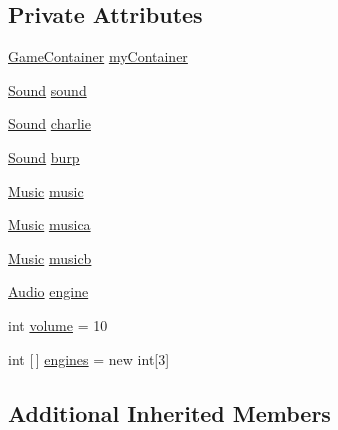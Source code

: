 \subsection*{Private Attributes}
\begin{DoxyCompactItemize}
\item 
\mbox{\hyperlink{classorg_1_1newdawn_1_1slick_1_1_game_container}{Game\+Container}} \mbox{\hyperlink{classorg_1_1newdawn_1_1slick_1_1tests_1_1_sound_test_a468a454f66fe1fd34c65142e04714822}{my\+Container}}
\item 
\mbox{\hyperlink{classorg_1_1newdawn_1_1slick_1_1_sound}{Sound}} \mbox{\hyperlink{classorg_1_1newdawn_1_1slick_1_1tests_1_1_sound_test_a09ece4f9c81bc9e940faf4695f839630}{sound}}
\item 
\mbox{\hyperlink{classorg_1_1newdawn_1_1slick_1_1_sound}{Sound}} \mbox{\hyperlink{classorg_1_1newdawn_1_1slick_1_1tests_1_1_sound_test_a12fab6de9e0ce011e4bba329374f33fc}{charlie}}
\item 
\mbox{\hyperlink{classorg_1_1newdawn_1_1slick_1_1_sound}{Sound}} \mbox{\hyperlink{classorg_1_1newdawn_1_1slick_1_1tests_1_1_sound_test_a2bf71f52b16b2e003d89b502c09d9a76}{burp}}
\item 
\mbox{\hyperlink{classorg_1_1newdawn_1_1slick_1_1_music}{Music}} \mbox{\hyperlink{classorg_1_1newdawn_1_1slick_1_1tests_1_1_sound_test_ab3bcadf737e7c10e434f159fdbbcdc32}{music}}
\item 
\mbox{\hyperlink{classorg_1_1newdawn_1_1slick_1_1_music}{Music}} \mbox{\hyperlink{classorg_1_1newdawn_1_1slick_1_1tests_1_1_sound_test_aabcdcde452619f429e244cc5e96a1cc8}{musica}}
\item 
\mbox{\hyperlink{classorg_1_1newdawn_1_1slick_1_1_music}{Music}} \mbox{\hyperlink{classorg_1_1newdawn_1_1slick_1_1tests_1_1_sound_test_a004624ee964031c8631c5e12d62cae9a}{musicb}}
\item 
\mbox{\hyperlink{interfaceorg_1_1newdawn_1_1slick_1_1openal_1_1_audio}{Audio}} \mbox{\hyperlink{classorg_1_1newdawn_1_1slick_1_1tests_1_1_sound_test_a50e2c16e909182d179399800b3692052}{engine}}
\item 
int \mbox{\hyperlink{classorg_1_1newdawn_1_1slick_1_1tests_1_1_sound_test_a04840bd9a205022350bdba7878d5e373}{volume}} = 10
\item 
int \mbox{[}$\,$\mbox{]} \mbox{\hyperlink{classorg_1_1newdawn_1_1slick_1_1tests_1_1_sound_test_a3c2e80c131dfc978a34de1ab9c476be2}{engines}} = new int\mbox{[}3\mbox{]}
\end{DoxyCompactItemize}
\subsection*{Additional Inherited Members}


